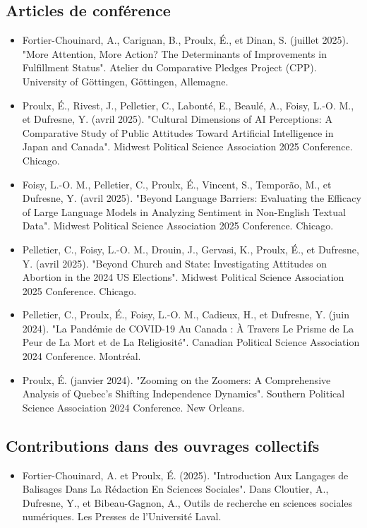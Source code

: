 \documentclass[11pt,letterpaper,sans]{moderncv}        %
\begin{document}
\subsection{\textbf{Articles de conférence}}
\begin{itemize}
    \item Fortier-Chouinard, A., Carignan, B., Proulx, É., et Dinan, S. (juillet 2025). "More Attention, More Action? The Determinants of Improvements in Fulfillment Status". Atelier du Comparative Pledges Project (CPP). University of Göttingen, Göttingen, Allemagne.
    \item Proulx, É., Rivest, J., Pelletier, C., Labonté, E., Beaulé, A., Foisy, L.-O. M., et Dufresne, Y. (avril 2025). "Cultural Dimensions of AI Perceptions: A Comparative Study of Public Attitudes Toward Artificial Intelligence in Japan and Canada". Midwest Political Science Association 2025 Conference. Chicago.
    \item Foisy, L.-O. M., Pelletier, C., Proulx, É., Vincent, S., Temporão, M., et Dufresne, Y. (avril 2025). "Beyond Language Barriers: Evaluating the Efficacy of Large Language Models in Analyzing Sentiment in Non-English Textual Data". Midwest Political Science Association 2025 Conference. Chicago.
    \item Pelletier, C., Foisy, L.-O. M., Drouin, J., Gervasi, K., Proulx, É., et Dufresne, Y. (avril 2025). "Beyond Church and State: Investigating Attitudes on Abortion in the 2024 US Elections". Midwest Political Science Association 2025 Conference. Chicago.
    \item Pelletier, C., Proulx, É., Foisy, L.-O. M., Cadieux, H., et Dufresne, Y. (juin 2024). "La Pandémie de COVID-19 Au Canada : À Travers Le Prisme de La Peur de La Mort et de La Religiosité". Canadian Political Science Association 2024 Conference. Montréal.
    \item Proulx, É. (janvier 2024). "Zooming on the Zoomers: A Comprehensive Analysis of Quebec's Shifting Independence Dynamics". Southern Political Science Association 2024 Conference. New Orleans.
\end{itemize}

\subsection{\textbf{Contributions dans des ouvrages collectifs}}
\begin{itemize}
  \item Fortier-Chouinard, A. et Proulx, É. (2025). "Introduction Aux Langages de Balisages Dans La Rédaction En Sciences Sociales". Dans Cloutier, A., Dufresne, Y., et Bibeau-Gagnon, A., Outils de recherche en sciences sociales numériques. Les Presses de l'Université Laval.
\end{itemize}
\end{document}

